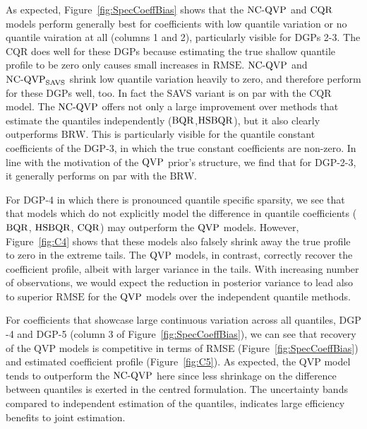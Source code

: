 As expected, Figure~\ref{fig:SpecCoeffBias} shows that the $\operatorname{NC-QVP}$ and $\operatorname{CQR}$ models perform generally best for coefficients with low quantile variation or no quantile vairation at all (columns 1 and 2), particularly visible for DGPs 2-3. The $\mathrm{CQR}$ does well for these DGPs because estimating the true shallow quantile profile to be zero only causes small increases in $\mathrm{RMSE}$. $\operatorname{NC-QVP}$ and $\operatorname{NC-QVP}_{\mathrm{SAVS}}$ shrink low quantile variation heavily to zero, and therefore perform for these DGPs well, too. In fact the SAVS variant is on par with the $\mathrm{CQR}$ model. %
The $\operatorname{NC-QVP}$ offers not only a large improvement over methods that estimate the quantiles independently ($\operatorname{BQR}$,$\operatorname{HSBQR}$), but it also clearly outperforms $\mathrm{BRW}$. This is particularly visible for the quantile constant coefficients of the $\mathrm{DGP}$-3, in which the true constant coefficients are non-zero. In line with the motivation of the $\operatorname{QVP}$ prior's structure, we find that for $\mathrm{DGP}$-2-3, it generally performs on par with the $\mathrm{BRW}$. 
%

For $\mathrm{DGP}$-4 in which there is pronounced quantile specific sparsity, we see that that  models which do not explicitly model the difference in quantile coefficients ($\operatorname{BQR}$, $\operatorname{HSBQR}$, $\operatorname{CQR}$) may outperform the $\operatorname{QVP}$ models. However, Figure~\ref{fig:C4} shows that these models also falsely shrink away the true profile to zero in the extreme tails. The $\operatorname{QVP}$ models, in contrast, correctly recover the coefficient profile, albeit with larger variance in the tails. With increasing number of observations, we would expect the reduction in posterior variance to lead also to superior $\mathrm{RMSE}$ for the $\operatorname{QVP}$ models over the independent quantile methods.
%

For coefficients that showcase large continuous variation across all quantiles, $\mathrm{DGP}$-4 and $\mathrm{DGP}$-5 (column 3 of Figure~\ref{fig:SpecCoeffBias}), we can see that recovery of the $\mathrm{QVP}$ models is competitive in terms of RMSE (Figure~\ref{fig:SpecCoeffBias}) and estimated coefficient profile (Figure~\ref{fig:C5}). As expected, the $\mathrm{QVP}$ model tends to outperform the $\operatorname{NC-QVP}$ here since less shrinkage on the difference between quantiles is exerted in the centred formulation. The uncertainty bands compared to independent estimation of the quantiles, indicates large efficiency benefits to joint estimation. 
%

